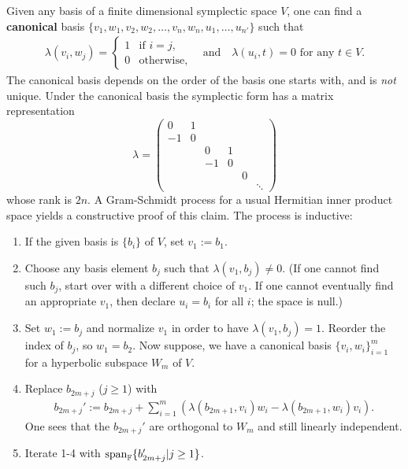 Given any basis of a finite dimensional symplectic space $V$,
one can find a {\bf canonical} basis $\{ v_1, w_1, v_2, w_2, \ldots, v_n, w_n, u_1, \ldots, u_{n'} \}$ such that
\begin{align*}
 \lambda(v_i, w_j ) = \begin{cases} 1 & \text{if } i=j , \\ 0 & \text{otherwise,} \end{cases}
  \quad \text{and} \quad \lambda( u_i, t ) = 0 \text{ for any } t \in V .
\end{align*}
The canonical basis depends on the order of the basis one starts with, and is \emph{not} unique.
Under the canonical basis the symplectic form has a matrix representation
\[
 \lambda = 
\begin{pmatrix}
 0  & 1 &   &   &   & \\
 -1 & 0 &   &   &   & \\
    &   & 0 & 1 &   & \\
    &   & -1& 0 &   & \\
    &   &   &   & 0 & \\
    &   &   &   &   & \ddots
\end{pmatrix}
\]
whose rank is $2n$.
A Gram-Schmidt process for a usual Hermitian inner product space yields a constructive proof of this claim.
The process is inductive:
\begin{enumerate}
 \item If the given basis is $\{b_i\}$ of $V$, set $v_1 := b_1$.
 \item Choose any basis element $b_j$ such that $\lambda(v_1, b_j) \neq 0$.
        (If one cannot find such $b_j$, start over with a different choice of $v_1$.
        If one cannot eventually find an appropriate $v_1$, then declare $u_i = b_i$ for all $i$; the space is null.)
 \item Set $w_1 := b_j$ and normalize $v_1$ in order to have $\lambda(v_1,b_j) = 1$.
      Reorder the index of $b_j$, so $w_1 = b_2$.
      Now suppose, we have a canonical basis $\{ v_i, w_i \}_{i=1}^{m}$ for a hyperbolic subspace $W_m$ of $V$.
 \item Replace $b_{2m+j}$ ($j\ge 1$) with
 \begin{align*}
  b_{2m+j}' := b_{2m+j} + \sum_{i=1}^m \left( \lambda( b_{2m+1}, v_i ) w_i - \lambda( b_{2m+1}, w_i ) v_i \right) .
 \end{align*}
       One sees that the $b_{2m+j}'$ are orthogonal to $W_m$ and still linearly independent.
 \item Iterate 1-4 with $\mathop{\mathrm{span}}\nolimits _{\mathbb{F}} \{ b'_{2m+j} | j \ge 1 \}$.
\end{enumerate}
